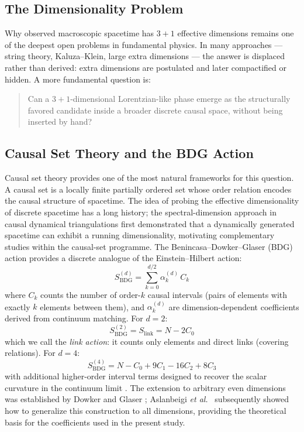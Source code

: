 \documentclass[12pt,a4paper]{article}
\begin{document}
\subsection{The Dimensionality Problem}
\label{sec:dim_problem}

Why observed macroscopic spacetime has $3{+}1$ effective dimensions remains one of the deepest open
problems in fundamental physics.
In many approaches --- string theory, Kaluza--Klein, large extra dimensions --- the answer is displaced
rather than derived: extra dimensions are postulated and later compactified or hidden.
A more fundamental question is:

\begin{quote}
Can a $3{+}1$-dimensional Lorentzian-like phase emerge as the structurally favored candidate inside a
broader discrete causal space, without being inserted by hand?
\end{quote}

\subsection{Causal Set Theory and the BDG Action}
\label{sec:causal_set}

Causal set theory \cite{Bombelli1987,Surya2019} provides one of the most natural frameworks for this
question. A causal set is a locally finite partially ordered set whose order relation encodes the causal
structure of spacetime.
The idea of probing the effective dimensionality of discrete spacetime has a long history;
the spectral-dimension approach \cite{Ambjorn2005} in causal dynamical triangulations
first demonstrated that a dynamically generated spacetime can exhibit
a running dimensionality, motivating complementary studies within the causal-set programme.
The Benincasa--Dowker--Glaser (BDG) action \cite{Benincasa2010} provides a
discrete analogue of the Einstein--Hilbert action:
\begin{equation}
S^{(d)}_\text{BDG} = \sum_{k=0}^{d/2} \alpha_k^{(d)} \, C_k
\label{eq:bdg_general}
\end{equation}
where $C_k$ counts the number of order-$k$ causal intervals (pairs of elements with exactly $k$ elements
between them), and $\alpha_k^{(d)}$ are dimension-dependent coefficients derived from continuum matching.
For $d=2$:
\begin{equation}
S^{(2)}_\text{BDG} = S_\text{link} = N - 2C_0
\label{eq:link_action}
\end{equation}
which we call the \emph{link action}: it counts only elements and direct links (covering relations).
For $d=4$:
\begin{equation}
S^{(4)}_\text{BDG} = N - C_0 + 9C_1 - 16C_2 + 8C_3
\label{eq:bdg_d4}
\end{equation}
with additional higher-order interval terms designed to recover the scalar curvature in the continuum limit \cite{Glaser2018}.
The extension to arbitrary even dimensions was established by Dowker and Glaser \cite{Dowker2013};
Aslanbeigi \emph{et al.}\ \cite{Aslanbeigi2014} subsequently showed how to generalize
this construction to all dimensions, providing the theoretical basis for the
coefficients used in the present study.
\end{document}
